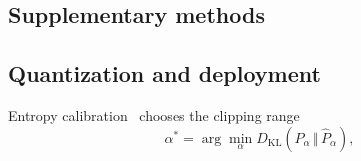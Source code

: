 \documentclass[pdflatex,sn-mathphys-num]{sn-jnl}%
\theoremstyle{thmstyleone}%
\theoremstyle{thmstyletwo}%
\theoremstyle{thmstylethree}%
\begin{document}
\begin{appendices}

\section{Supplementary methods}\label{sec:supp-methods}

\subsection{Quantization and deployment}\label{sec:supp-quant}
Entropy calibration~\cite{migacz2017tensorrt} chooses the clipping range
\begin{equation}
\alpha^\ast=\arg\min_{\alpha}D_\mathrm{KL}\!\left(P_\alpha\,\Vert\,\hat P_\alpha\right),\label{eq:entropy}
\end{equation}

\end{appendices}
\end{document}
